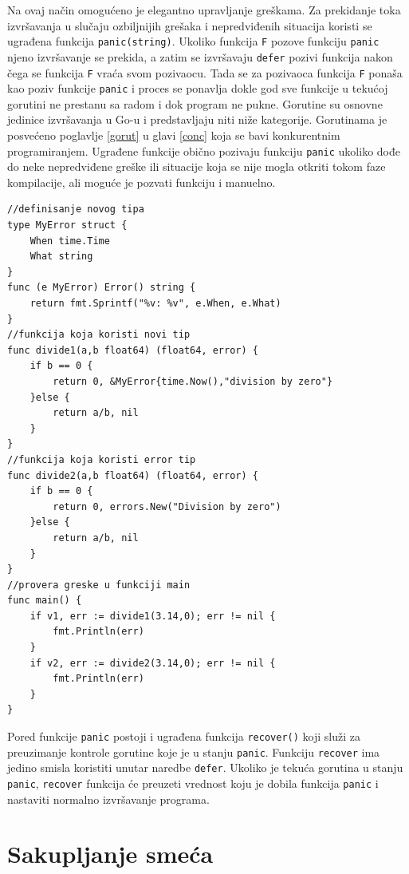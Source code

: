 \documentclass[12pt,oneside]{memoir}
\begin{document}
Na ovaj način omogućeno je elegantno upravljanje greškama. Za prekidanje toka izvršavanja u slučaju ozbiljnijih grešaka i nepredviđenih situacija koristi se ugrađena funkcija \texttt{panic(string)}. Ukoliko funkcija \texttt{F} pozove funkciju \texttt{panic} njeno izvršavanje se prekida, a zatim se izvršavaju \texttt{defer} pozivi funkcija nakon čega se funkcija \texttt{F} vraća svom pozivaocu. Tada se za pozivaoca funkcija \texttt{F} ponaša kao poziv funkcije \texttt{panic} i proces se ponavlja dokle god sve funkcije u tekućoj gorutini ne prestanu sa radom i dok program ne pukne. Gorutine su osnovne jedinice izvršavanja u Go-u i predstavljaju niti niže kategorije. Gorutinama je posvećeno poglavlje \ref{gorut} u  glavi \ref{conc} koja se bavi konkurentnim programiranjem.  Ugrađene funkcije obično pozivaju funkciju \texttt{panic} ukoliko dođe do neke nepredviđene greške ili situacije koja se nije mogla otkriti tokom faze kompilacije, ali moguće je pozvati funkciju i manuelno. 

\begin{center}
\begin{lstlisting}[caption=Primer koji demonstrira upravljanje greškama, label={lst:error},  backgroundcolor=\color{background}]
//definisanje novog tipa
type MyError struct {
	When time.Time
	What string
}
func (e MyError) Error() string {
	return fmt.Sprintf("%v: %v", e.When, e.What)
}
//funkcija koja koristi novi tip
func divide1(a,b float64) (float64, error) {
	if b == 0 {
		return 0, &MyError{time.Now(),"division by zero"}
	}else {
		return a/b, nil
	}
}
//funkcija koja koristi error tip
func divide2(a,b float64) (float64, error) {
	if b == 0 {
		return 0, errors.New("Division by zero")
	}else {
		return a/b, nil
	}
}
//provera greske u funkciji main
func main() {
	if v1, err := divide1(3.14,0); err != nil {
		fmt.Println(err)				
	}
	if v2, err := divide2(3.14,0); err != nil {
		fmt.Println(err)			
	}
}
\end{lstlisting}
\end{center}

Pored funkcije \texttt{panic} postoji i ugrađena funkcija \texttt{recover()} koji služi za preuzimanje kontrole gorutine koje je u stanju \texttt{panic}. Funkciju \texttt{recover} ima jedino smisla koristiti unutar naredbe \texttt{defer}. Ukoliko je tekuća gorutina u stanju \texttt{panic}, \texttt{recover} funkcija će preuzeti vrednost koju je dobila funkcija \texttt{panic} i nastaviti normalno izvršavanje programa.
 
\section{Sakupljanje smeća}
\end{document}
